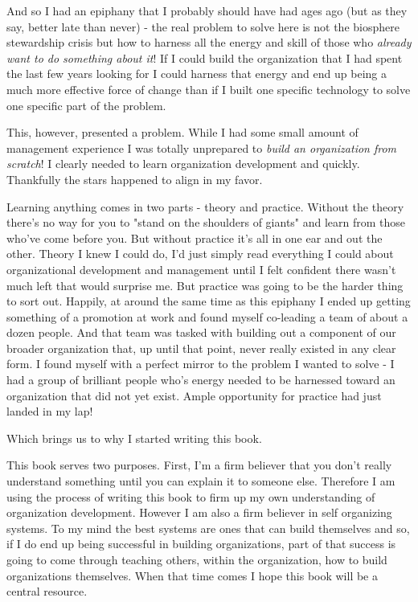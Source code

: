 \documentclass[11pt]{book}
\begin{document}
And so I had an epiphany that I probably should have had ages ago (but as they say, better late than never) - the real problem to solve here is not the biosphere stewardship crisis but how to harness all the energy and skill of those who \textit{already want to do something about it}! If I could build the organization that I had spent the last few years looking for I could harness that energy and end up being a much more effective force of change than if I built one specific technology to solve one specific part of the problem. 
\newline

This, however, presented a problem. While I had some small amount of management experience I was totally unprepared to \textit{build an organization from scratch}! I clearly needed to learn organization development and quickly. Thankfully the stars happened to align in my favor.
\newline

Learning anything comes in two parts - theory and practice. Without the theory there's no way for you to "stand on the shoulders of giants" and learn from those who've come before you. But without practice it's all in one ear and out the other. Theory I knew I could do, I'd just simply read everything I could about organizational development and management until I felt confident there wasn't much left that would surprise me. But practice was going to be the harder thing to sort out. Happily, at around the same time as this epiphany I ended up getting something of a promotion at work and found myself co-leading a team of about a dozen people. And that team was tasked with building out a component of our broader organization that, up until that point, never really existed in any clear form. I found myself with a perfect mirror to the problem I wanted to solve - I had a group of brilliant people who's energy needed to be harnessed toward an organization that did not yet exist. Ample opportunity for practice had just landed in my lap!
\newline

Which brings us to why I started writing this book.
\newline

This book serves two purposes. First, I'm a firm believer that you don't really understand something until you can explain it to someone else. Therefore I am using the process of writing this book to firm up my own understanding of organization development. However I am also a firm believer in self organizing systems. To my mind the best systems are ones that can build themselves and so, if I do end up being successful in building organizations, part of that success is going to come through teaching others, within the organization, how to build organizations themselves. When that time comes I hope this book will be a central resource.
\newline
\end{document}
